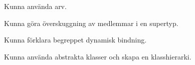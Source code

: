 
\item Kunna använda arv.
\item Kunna göra överskuggning av medlemmar i en supertyp.
\item Kunna förklara begreppet dynamisk bindning.
\item Kunna använda abstrakta klasser och skapa en klasshierarki.
